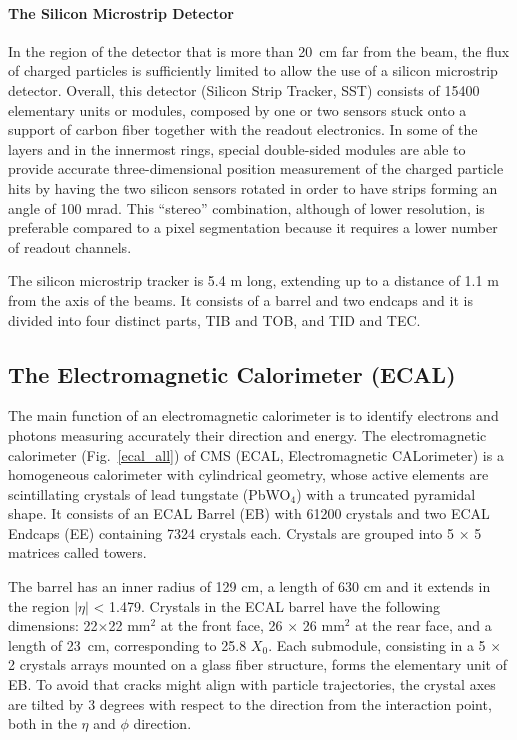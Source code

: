 \paragraph*{The Silicon Microstrip Detector} In the region of the detector that is more than 20~cm far from the beam, the flux of
charged particles is sufficiently limited to allow the use of a silicon microstrip detector. Overall, this detector (Silicon
Strip Tracker, SST) consists of 15400 elementary units or modules,
composed by one or two sensors stuck onto a support of carbon fiber together with the readout
electronics. In some of the layers and in the innermost rings, special
double-sided modules are able to provide accurate three-dimensional
position measurement of the charged particle hits by having the two silicon
sensors rotated in order to have strips forming an angle of 100 mrad. 
This “stereo” combination, although of lower resolution, is preferable
compared to a pixel segmentation because it requires a lower number of
readout channels.  

The
silicon microstrip tracker is 5.4 m long, extending up to a distance of 1.1 m from the axis
of the beams. It consists of a barrel and two endcaps and it is divided into four distinct
parts, TIB and TOB, and TID and TEC.


\subsection*{The Electromagnetic Calorimeter (ECAL)}
The main function of an electromagnetic calorimeter is to identify
electrons and photons measuring accurately their direction and energy. The electromagnetic calorimeter (Fig.~\ref{ecal_all}) of
CMS (ECAL, Electromagnetic CALorimeter)  is a homogeneous calorimeter with
cylindrical geometry, whose active elements are scintillating crystals of lead tungstate (PbWO$_4$)
with a truncated pyramidal shape. It consists of an ECAL Barrel (EB) with 61200 crystals
and two ECAL Endcaps (EE) containing 7324 crystals each.
Crystals are grouped into 5 × 5 matrices called towers.

The barrel has an inner radius of
129 cm, a length of 630 cm and it extends in the region $|\eta|$ < 1.479. Crystals in the ECAL
barrel have the following dimensions: 22$\times$22 mm$^2$ at the front face, 26 $\times$ 26 mm$^2$ at the
rear face, and a length of 23~cm, corresponding to 25.8 $X_0$. Each submodule, consisting
in a 5 $\times$ 2 crystals arrays mounted on a glass fiber structure, forms the elementary unit of
EB.
To avoid that cracks might align with
particle trajectories, the crystal axes are tilted by 3 degrees with respect to the direction from
the interaction point, both in the $\eta$ and $\phi$ direction.


